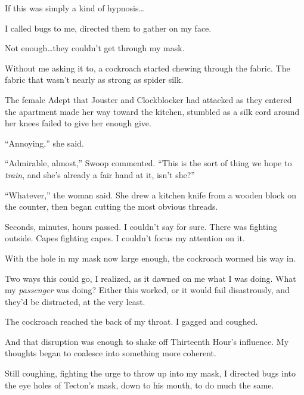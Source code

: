 If this was simply a kind of hypnosis\ldots



I called bugs to me, directed them to gather on my face.



Not enough\ldots they couldn't get through my mask.



Without me asking it to, a cockroach started chewing through the fabric.  The fabric that wasn't nearly as strong as spider silk.



The female Adept that Jouster and Clockblocker had attacked as they entered the apartment made her way toward the kitchen, stumbled as a silk cord around her knees failed to give her enough give.



``Annoying,'' she said.



``Admirable, almost,'' Swoop commented.  ``This is the sort of thing we hope to \emph{train}, and she's already a fair hand at it, isn't she?''



``Whatever,'' the woman said.  She drew a kitchen knife from a wooden block on the counter, then began cutting the most obvious threads.



Seconds, minutes, hours passed.  I couldn't say for sure.  There was fighting outside.  Capes fighting capes.  I couldn't focus my attention on it.



With the hole in my mask now large enough, the cockroach wormed his way in.



Two ways this could go, I realized, as it dawned on me what I was doing.  What my \emph{passenger} was doing?  Either this worked, or it would fail disastrously, and they'd be distracted, at the very least.



The cockroach reached the back of my throat.  I gagged and coughed.



And that disruption was enough to shake off Thirteenth Hour's influence.  My thoughts began to coalesce into something more coherent.



Still coughing, fighting the urge to throw up into my mask, I directed bugs into the eye holes of Tecton's mask, down to his mouth, to do much the same.



